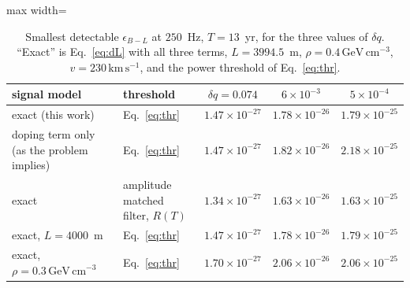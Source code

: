 \begin{table}[t]
\centering
\caption{Smallest detectable $\epsilon_{B-L}$ at $250$~Hz, $T=13$~yr, for the three values of $\delta q$. ``Exact'' is Eq.~\eqref{eq:dL} with all three terms, $L=3994.5$~m, $\rho=0.4\,\mathrm{GeV\,cm^{-3}}$, $v=230\,\mathrm{km\,s^{-1}}$, and the power threshold of Eq.~\eqref{eq:thr}.}
\label{tab:results}
\small
\begin{adjustbox}{max width=\linewidth}
\begin{tabular}{llccc}
\toprule
signal model & threshold & $\delta q=0.074$ & $6\times10^{-3}$ & $5\times10^{-4}$ \\
\midrule
exact (this work) & Eq.~\eqref{eq:thr} & $1.47\times10^{-27}$ & $1.78\times10^{-26}$ & $1.79\times10^{-25}$ \\
doping term only (as the problem implies) & Eq.~\eqref{eq:thr} & $1.47\times10^{-27}$ & $1.82\times10^{-26}$ & $2.18\times10^{-25}$ \\
exact & amplitude matched filter, $R(T)$ & $1.34\times10^{-27}$ & $1.63\times10^{-26}$ & $1.63\times10^{-25}$ \\
exact, $L=4000$~m & Eq.~\eqref{eq:thr} & $1.47\times10^{-27}$ & $1.78\times10^{-26}$ & $1.79\times10^{-25}$ \\
exact, $\rho=0.3\,\mathrm{GeV\,cm^{-3}}$ & Eq.~\eqref{eq:thr} & $1.70\times10^{-27}$ & $2.06\times10^{-26}$ & $2.06\times10^{-25}$ \\
\bottomrule
\end{tabular}
\end{adjustbox}
\end{table}

